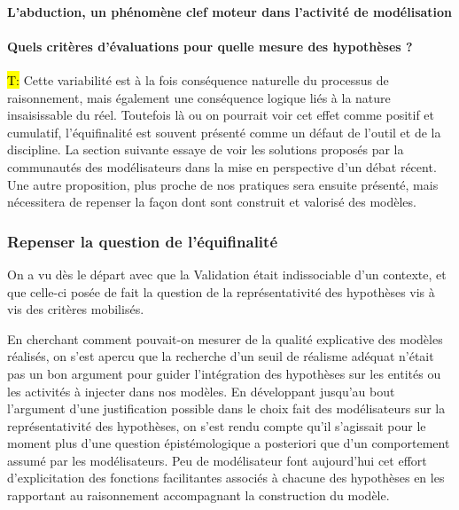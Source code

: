 \paragraph{L'abduction, un phénomène clef moteur dans l'activité de modélisation}
\label{p:abduction}



\paragraph{Quels critères d'évaluations pour quelle mesure des hypothèses ?}
\label{p:critere_evaluation}



\hl{T:} 
Cette variabilité est à la fois conséquence naturelle du processus de raisonnement, mais également une conséquence logique liés à la nature insaisissable du réel. Toutefois là ou on pourrait voir cet effet comme positif et cumulatif, l'équifinalité est souvent présenté comme un défaut de l'outil et de la discipline. La section suivante essaye de voir les solutions proposés par la communautés des modélisateurs dans la mise en perspective d'un débat récent. Une autre proposition, plus proche de nos pratiques sera ensuite présenté, mais nécessitera de repenser la façon dont sont construit et valorisé des modèles. %

\subsubsection{Repenser la question de l'équifinalité}
\label{sssec:equifinalite}

On a vu dès le départ avec \textcite{Hermann1967} que la Validation était indissociable d'un contexte, et que celle-ci posée de fait la question de la représentativité des hypothèses vis à vis des critères mobilisés. 

En cherchant comment pouvait-on mesurer de la qualité explicative des modèles réalisés, on s'est apercu que la recherche d'un seuil de réalisme adéquat n'était pas un bon argument pour guider l'intégration des hypothèses sur les entités ou les activités à injecter dans nos modèles. En développant jusqu'au bout l'argument d'une justification possible dans le choix fait des modélisateurs sur la représentativité des hypothèses, on s'est rendu compte qu'il s'agissait pour le moment plus d'une question épistémologique a posteriori que d'un comportement assumé par les modélisateurs. Peu de modélisateur font aujourd'hui cet effort d'explicitation des fonctions facilitantes associés à chacune des hypothèses en les rapportant au raisonnement accompagnant la construction du modèle.

